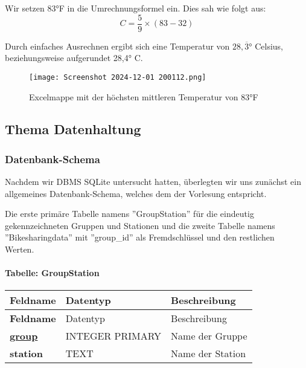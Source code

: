 \documentclass[11pt]{article}
\begin{document}
\begin{enumerate}
    Wir setzen 83°F in die Umrechnungsformel ein. Dies sah wie folgt aus:
\[C = \frac{5}{9} \times (83 - 32) \]

    Durch einfaches Ausrechnen ergibt sich eine Temperatur von \( 28,\overline{3} \)° Celsius, beziehungsweise aufgerundet 28,4° C.

\begin{figure}[H]
    \centering
    \texttt{[image: Screenshot 2024-12-01 200112.png]}
    \caption{Excelmappe mit der höchsten mittleren Temperatur von 83°F}
    \label{fig:second-figure}
\end{figure}
        
\end{enumerate}


\subsection{Thema Datenhaltung}

\subsubsection{Datenbank-Schema}
Nachdem wir DBMS SQLite untersucht hatten, überlegten wir uns zunächst ein allgemeines Datenbank-Schema, welches dem der Vorlesung entspricht.

Die erste primäre Tabelle namens ''GroupStation'' für die eindeutig \\ gekennzeichneten Gruppen und Stationen und die zweite Tabelle namens ''Bikesharingdata'' mit ''group\_id'' als Fremdschlüssel und den restlichen \\ Werten.

\paragraph*{Tabelle: GroupStation}

\begin{longtable}{|>{\bfseries}l|l|l|}
\hline
Feldname & \textbf{Datentyp} & \textbf{Beschreibung} \\
\hline
\endfirsthead
\hline
Feldname & Datentyp & Beschreibung \\
\hline
\endhead
\hline
\underline{group} & INTEGER PRIMARY & Name der Gruppe \\
station & TEXT & Name der Station \\
\hline
\end{longtable}
\end{document}
